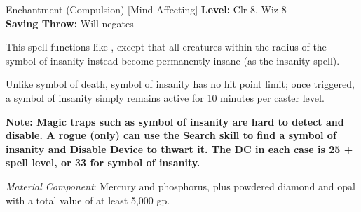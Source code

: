 {Enchantment (Compulsion) [Mind-Affecting]}
{
	\textbf{Level:}
	Clr 8, Wiz 8\\
	\textbf{Saving Throw:}
	Will negates\\
}
{
	This spell functions like , except that all creatures within the radius of the symbol of insanity instead become permanently insane (as the insanity spell).

	Unlike symbol of death, symbol of insanity has no hit point limit; once triggered, a symbol of insanity simply remains active for 10 minutes per caster level.

	\textbf{Note: Magic traps such as symbol of insanity are hard to detect and disable. A rogue (only) can use the Search skill to find a symbol of insanity and Disable Device to thwart it. The DC in each case is 25 + spell level, or 33 for symbol of insanity.}

	\textit{Material Component}:
	Mercury and phosphorus, plus powdered diamond and opal with a total value of at least 5,000 gp.

}
